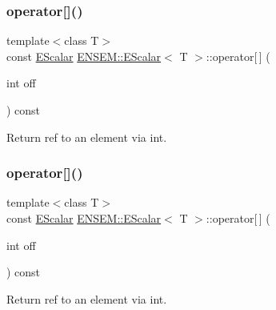 \subsubsection{\texorpdfstring{operator[]()}{operator[]()}\hspace{0.1cm}{\footnotesize\ttfamily [1/3]}}
{\footnotesize\ttfamily template$<$class T$>$ \\
const \mbox{\hyperlink{classENSEM_1_1EScalar}{E\+Scalar}} \mbox{\hyperlink{classENSEM_1_1EScalar}{E\+N\+S\+E\+M\+::\+E\+Scalar}}$<$ T $>$\+::operator\mbox{[}$\,$\mbox{]} (\begin{DoxyParamCaption}\item[{int}]{off }\end{DoxyParamCaption}) const\hspace{0.3cm}{\ttfamily [inline]}}



Return ref to an element via int. 

\mbox{\label{classENSEM_1_1EScalar_a20c80375941641aca36355253b3479ac}} 
\subsubsection{\texorpdfstring{operator[]()}{operator[]()}\hspace{0.1cm}{\footnotesize\ttfamily [2/3]}}
{\footnotesize\ttfamily template$<$class T$>$ \\
const \mbox{\hyperlink{classENSEM_1_1EScalar}{E\+Scalar}} \mbox{\hyperlink{classENSEM_1_1EScalar}{E\+N\+S\+E\+M\+::\+E\+Scalar}}$<$ T $>$\+::operator\mbox{[}$\,$\mbox{]} (\begin{DoxyParamCaption}\item[{int}]{off }\end{DoxyParamCaption}) const\hspace{0.3cm}{\ttfamily [inline]}}



Return ref to an element via int. 

\mbox{\label{classENSEM_1_1EScalar_a20c80375941641aca36355253b3479ac}} 
